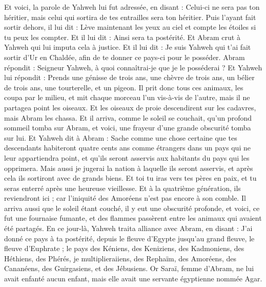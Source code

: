 \begin{multicols}{2}
Et voici, la parole de Yahweh lui fut adressée, en disant : Celui-ci ne sera pas ton héritier, mais celui qui sortira de tes entrailles sera ton héritier.
Puis l'ayant fait sortir dehors, il lui dit : Lève maintenant les yeux au ciel et compte les étoiles si tu peux les compter. Et il lui dit : Ainsi sera ta postérité.
Et Abram crut à Yahweh qui lui imputa cela à justice.
Et il lui dit : Je suis Yahweh qui t'ai fait sortir d'Ur en Chaldée, afin de te donner ce pays-ci pour le posséder.
Abram répondit : Seigneur Yahweh, à quoi connaîtrai-je que je le posséderai ?
Et Yahweh lui répondit : Prends une génisse de trois ans, une chèvre de trois ans, un bélier de trois ans, une tourterelle, et un pigeon.
Il prit donc tous ces animaux, les coupa par le milieu, et mit chaque morceau l'un vis-à-vis de l'autre, mais il ne partagea point les oiseaux.
Et les oiseaux de proie descendirent sur les cadavres, mais Abram les chassa.
Et il arriva, comme le soleil se couchait, qu'un profond sommeil tomba sur Abram, et voici, une frayeur d'une grande obscurité tomba sur lui.
Et Yahweh dit à Abram : Sache comme une chose certaine que tes descendants habiteront quatre cents ans comme étrangers dans un pays qui ne leur appartiendra point, et qu'ils seront asservis aux habitants du pays qui les opprimera.
Mais aussi je jugerai la nation à laquelle ils seront asservis, et après cela ils sortiront avec de grands biens.
Et toi tu iras vers tes pères en paix, et tu seras enterré après une heureuse vieillesse.
Et à la quatrième génération, ils reviendront ici ; car l'iniquité des Amoréens n'est pas encore à son comble.
Il arriva aussi que le soleil étant couché, il y eut une obscurité profonde, et voici, ce fut une fournaise fumante, et des flammes passèrent entre les animaux qui avaient été partagés.
En ce jour-là, Yahweh traita alliance avec Abram, en disant : J'ai donné ce pays à ta postérité, depuis le fleuve d'Egypte jusqu'au grand fleuve, le fleuve d'Euphrate ;
le pays des Kéniens, des Keniziens, des Kadmoniens,
des Héthiens, des Phérés, je multiplieraiiens, des Rephaïm,
des Amoréens, des Cananéens, des Guirgasiens, et des Jébusiens.
\VerseOne{}Or Saraï, femme d'Abram, ne lui avait enfanté aucun enfant, mais elle avait une servante égyptienne nommée Agar.

\end{multicols}
